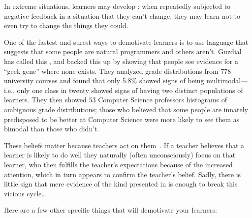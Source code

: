In extreme situations,
learners may develop :
when repeatedly subjected to negative feedback in a situation that they can't change,
they may learn not to even try to change the things they could.

One of the fastest and surest ways to demotivate learners is
to use language that suggests that some people are natural programmers and others aren't.
Guzdial has called this
,
and \cite{Pati2016} backed this up by showing that people see evidence for a ``geek gene'' where none exists.
They analyzed grade distributions from 778 university courses and found that only 5.8\% showed signs of being multimodal---i.e.,
only one class in twenty showed signs of having two distinct populations of learners.
They then showed 53 Computer Science professors histograms of ambiguous grade distributions;
those who believed that some people are innately predisposed to be better at Computer Science
were more likely to see them as bimodal than those who didn't.

These beliefs matter because teachers act on them~\cite{Brop1983}.
If a teacher believes that a learner is likely to do well
they naturally (often unconsciously) focus on that learner,
who then fulfills the teacher's expectations because of the increased attention,
which in turn appears to confirm the teacher's belief.
Sadly,
there is little sign that mere evidence of the kind presented in \cite{Pati2016}
is enough to break this vicious cycle{\ldots}

Here are a few other specific things that will demotivate your learners:

